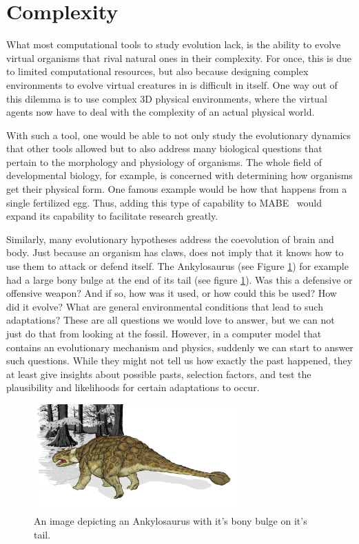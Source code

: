 \documentclass[12pt,oneside,listof=totoc,paper=a4,headings=small]{scrbook}
\begin{document}
\section{Complexity}
What most computational tools to study evolution lack, is the ability to evolve virtual organisms that rival natural ones in their complexity. For once, this is due to limited computational resources, but also because designing complex environments to evolve virtual creatures in is difficult in itself. One way out of this dilemma is to use complex 3D physical environments, where the virtual agents now have to deal with the complexity of an actual physical world. 

With such a tool, one would be able to not only study the evolutionary dynamics that other tools allowed but to also address many biological questions that pertain to the morphology and physiology of organisms. The whole field of developmental biology, for example, is concerned with determining how organisms get their physical form. One famous example would be how that happens from a single fertilized egg. Thus, adding this type of capability to MABE~\cite{MABE2016,bohm2017mabe} would expand its capability to facilitate research greatly.

Similarly, many evolutionary hypotheses address the coevolution of brain and body. Just because an organism has claws, does not imply that it knows how to use them to attack or defend itself. The Ankylosaurus (see Figure \ref{fig:Ankylosaurus_dinosaur}) for example had a large bony bulge at the end of its tail (see figure \ref{fig:Ankylosaurus_dinosaur}). Was this a defensive or offensive weapon? And if so, how was it used, or how could this be used? How did it evolve? What are general environmental conditions that lead to such adaptations? These are all questions we would love to answer, but we can not just do that from looking at the fossil. However, in a computer model that contains an evolutionary mechanism and physics, suddenly we can start to answer such questions. While they might not tell us how exactly the past happened, they at least give insights about possible pasts, selection factors, and test the plausibility and likelihoods for certain adaptations to occur. 



\begin{figure}[h!]
\centering
\includegraphics[width=0.7\textwidth,height=0.7\textheight,keepaspectratio]{images/Ankylosaurus_dinosaur.png}
\caption{An image depicting an Ankylosaurus with it's bony bulge on it's tail.~\cite{dino}}
\label{fig:Ankylosaurus_dinosaur}
\end{figure}
\end{document}
